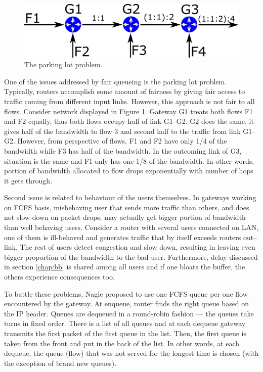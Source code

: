 \begin{figure}
	\centering
	\includegraphics[width=137mm]{drawings/parking_lot}
	\caption{The parking lot problem. }
	
	\label{fig05:ParkingLot}
\end{figure}

One of the issues addressed by fair queueing is the parking lot problem. Typically, routers accomplish some amount of fairness by giving fair access to traffic coming from different input links. However, this approach is not fair to all flows. Consider network displayed in Figure \ref{fig05:ParkingLot}. Gateway G1 treats both flows F1 and F2 equally, thus both flows occupy half of link G1--G2. G2 does the same, it gives half of the bandwidth to flow 3 and second half to the traffic from link G1--G2. However, from perspective of flows, F1 and F2 have only 1/4 of the bandwidth while F3 has half of the bandwidth. In the outcoming link of G3, situation is the same and F1 only has one 1/8 of the bandwidth. In other words, portion of bandwidth allocated to flow drops exponentially with number of hops it gets through.

Second issue is related to behaviour of the users themselves. In gateways working on FCFS basis, misbehaving user that sends more traffic than others, and does not slow down on packet drops, may actually get bigger portion of bandwidth than well behaving users. Consider a router with several users connected on LAN, one of them is ill-behaved and generates traffic that by itself exceeds routers out--link. The rest of users detect congestion and slow down, resulting in leaving even bigger proportion of the bandwidth to the bad user. Furthermore, delay discussed in section \ref{chap:bb} is shared among all users and if one bloats the buffer, the others experience consequences too.

To battle these problems, Nagle \cite{Nagle:FQ} proposed to use one FCFS queue per one flow encountered by the gateway. At enqueue, router finds the right queue based on the IP header. Queues are dequeued in a round-robin fashion --- the queues take turns in fixed order. There is a list of all queues and at each dequeue gateway transmits the first packet of the first queue in the list. Then, the first queue is taken from the front and put in the back of the list. In other words, at each dequeue, the queue (flow) that was not served for the longest time is chosen (with the exception of brand new queues).

